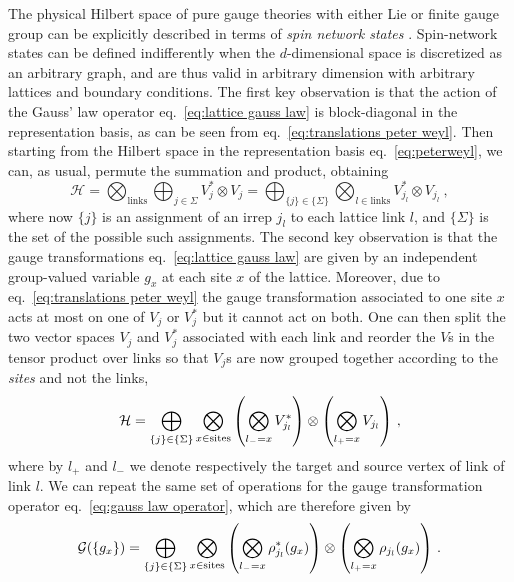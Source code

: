 The physical Hilbert space of pure gauge theories with either Lie or finite gauge group can be explicitly described in terms of \textit{spin network states} \cite{Baez, Burgio}.
Spin-network states can be defined indifferently when the $d$-dimensional space is discretized as an arbitrary graph, and are thus valid in arbitrary dimension with arbitrary lattices and boundary conditions.
The first key observation is that the action of the Gauss' law operator eq.~\eqref{eq:lattice gauss law} is block-diagonal in the representation basis, as can be seen from eq.~\eqref{eq:translations peter weyl}.
Then starting from the Hilbert space in the representation basis eq.~\eqref{eq:peterweyl}, we can, as usual, permute the summation and product, obtaining
\begin{equation}
    \label{eq:hilbert space permuted}
    \mathcal{H} = \bigotimes_{\mathrm{links}} \bigoplus_{j \in \Sigma} V_j^* \otimes V_j=\bigoplus_{\{j\} \in \{\Sigma\}} \bigotimes_{l \in \mathrm{links}}  V_{j_l}^* \otimes V_{j_l} \ ,
\end{equation}
where now $\{j\}$ is an assignment of an irrep $j_l$ to each lattice link $l$, and $\{\Sigma\}$ is the set of the possible such assignments.
The second key observation is that the gauge transformations eq.~\eqref{eq:lattice gauss law} are given by an independent group-valued variable $g_x$ at each site $x$ of the lattice.
Moreover, due to eq.~\eqref{eq:translations peter weyl} the gauge transformation associated to one site $x$ acts at most on one of $V_j$ or $V_j^*$ but it cannot act on both.
One can then split the two vector spaces $V_j$ and $V_j^*$ associated with each link and reorder the $V$s in the tensor product over links so that $V_j$s are now grouped together according to the \textit{sites} and not the links,
\begin{equation}
    \mathcal{H} = \bigoplus_{\{j\} \in \{\Sigma\}} \bigotimes_{x \in \mathrm{sites}} \pqty{\bigotimes_{l_-=x} V_{j_l}^*} \otimes \pqty{\bigotimes_{l_+=x} V_{j_l} }\ ,
\end{equation}
where by $l_+$ and $l_-$ we denote respectively the target and source vertex of link of link $l$.
We can repeat the same set of operations for the gauge transformation operator eq.~\eqref{eq:gauss law operator}, which are therefore given by
\begin{equation}
    \mathcal{G}(\{g_x\}) = \bigoplus_{\{j\} \in \{\Sigma\}} \bigotimes_{x \in \mathrm{sites}} \pqty{\bigotimes_{l_-=x} \rho_{j_l}^*(g_x)} \otimes \pqty{\bigotimes_{l_+=x} \rho_{j_l}(g_x) }\ .
\end{equation}
